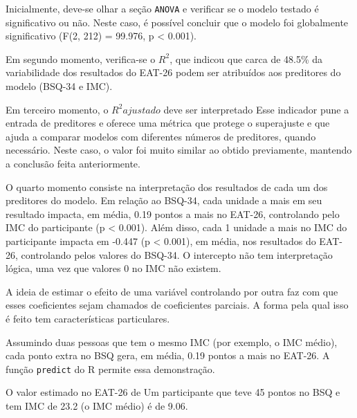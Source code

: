 \documentclass[
]{book}
\newenvironment{Shaded}{\begin{snugshade}}{\end{snugshade}}
\newcommand{\AttributeTok}[1]{\textcolor[rgb]{0.77,0.63,0.00}{#1}}
\newcommand{\DecValTok}[1]{\textcolor[rgb]{0.00,0.00,0.81}{#1}}
\newcommand{\FunctionTok}[1]{\textcolor[rgb]{0.00,0.00,0.00}{#1}}
\newcommand{\NormalTok}[1]{#1}
\newcommand{\OtherTok}[1]{\textcolor[rgb]{0.56,0.35,0.01}{#1}}
\newcommand{\SpecialCharTok}[1]{\textcolor[rgb]{0.00,0.00,0.00}{#1}}
\begin{document}
Inicialmente, deve-se olhar a seção \texttt{ANOVA} e verificar se o modelo testado é significativo ou não. Neste caso, é possível concluir que o modelo foi globalmente significativo (F(2, 212) = 99.976, p \textless{} 0.001).

Em segundo momento, verifica-se o \(R^2\), que indicou que carca de 48.5\% da variabilidade dos resultados do EAT-26 podem ser atribuídos aos preditores do modelo (BSQ-34 e IMC).

Em terceiro momento, o \(R^2 ajustado\) deve ser interpretado Esse indicador pune a entrada de preditores e oferece uma métrica que protege o superajuste e que ajuda a comparar modelos com diferentes números de preditores, quando necessário. Neste caso, o valor foi muito similar ao obtido previamente, mantendo a conclusão feita anteriormente.

O quarto momento consiste na interpretação dos resultados de cada um dos preditores do modelo. Em relação ao BSQ-34, cada unidade a mais em seu resultado impacta, em média, 0.19 pontos a mais no EAT-26, controlando pelo IMC do participante (p \textless{} 0.001). Além disso, cada 1 unidade a mais no IMC do participante impacta em -0.447 (p \textless{} 0.001), em média, nos resultados do EAT-26, controlando pelos valores do BSQ-34. O intercepto não tem interpretação lógica, uma vez que valores 0 no IMC não existem.

A ideia de estimar o efeito de uma variável controlando por outra faz com que esses coeficientes sejam chamados de coeficientes parciais. A forma pela qual isso é feito tem características particulares.

Assumindo duas pessoas que tem o mesmo IMC (por exemplo, o IMC médio), cada ponto extra no BSQ gera, em média, 0.19 pontos a mais no EAT-26. A função \texttt{predict} do R permite essa demonstração.

O valor estimado no EAT-26 de Um participante que teve 45 pontos no BSQ e tem IMC de 23.2 (o IMC médio) é de 9.06.

\begin{Shaded}
\end{Shaded}
\end{document}
